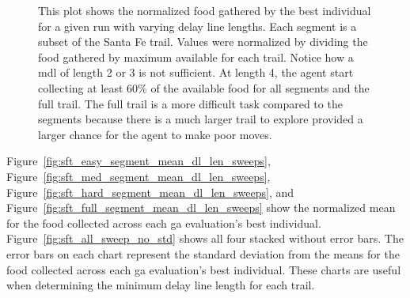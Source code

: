 \begin{figure}[hbt]
\centering
{}
\caption[Maximum Food Gathered by Varying Delay Line Length]{This plot shows the normalized food gathered by the best individual for a given run with varying delay line lengths. Each segment is a subset of the Santa Fe trail. Values were normalized by dividing the food gathered by maximum available for each trail. Notice how a \gls{mdl} of length 2 or 3 is not sufficient. At length 4, the agent start collecting at least 60\% of the available food for all segments and the full trail. The full trail is a more difficult task compared to the segments because there is a much larger trail to explore provided a larger chance for the agent to make poor moves.}
\label{fig:sft_segment_dl_len_sweeps}
\end{figure}

\clearpage
Figure~\ref{fig:sft_easy_segment_mean_dl_len_sweeps}, Figure~\ref{fig:sft_med_segment_mean_dl_len_sweeps}, Figure~\ref{fig:sft_hard_segment_mean_dl_len_sweeps}, and Figure~\ref{fig:sft_full_segment_mean_dl_len_sweeps} show the normalized mean for the food collected across each \gls{ga} evaluation's best individual. Figure~\ref{fig:sft_all_sweep_no_std} shows all four stacked without error bars. The error bars on each chart represent the standard deviation from the means for the food collected across each \gls{ga} evaluation's best individual. These charts are useful when determining the minimum delay line length for each trail.

